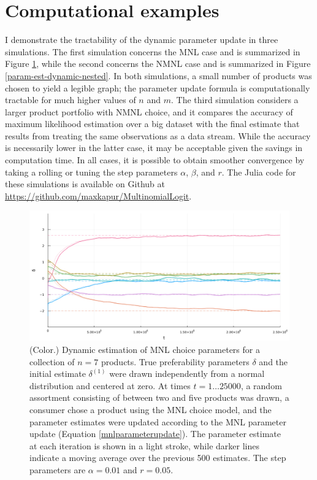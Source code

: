 \documentclass[preprint,12pt,authoryear]{elsarticle}
\begin{document}
\section{Computational examples}
I demonstrate the tractability of the dynamic parameter update in three simulations. The first simulation concerns the MNL case and is summarized in Figure \ref{param-est-dynamic-nonnested}, while the second concerns the NMNL case and is summarized in Figure \ref{param-est-dynamic-nested}. In both simulations, a small number of products was chosen to yield a legible graph; the parameter update formula is computationally tractable for much higher values of $n$ and $m$. The third simulation considers a larger product portfolio with NMNL choice, and it compares the accuracy of maximum likelihood estimation over a big dataset with the final estimate that results from treating the same observations as a data stream. While the accuracy is necessarily lower in the latter case, it may be acceptable given the savings in computation time. In all cases, it is possible to obtain smoother convergence by taking a rolling or tuning the step parameters $\alpha$, $\beta$, and $r$. The Julia code for these simulations is available on Github at \url{https://github.com/maxkapur/MultinomialLogit}. 





\begin{figure}
\begin{center}\includegraphics[width=\textwidth]{../plots/param-est-dynamic-nonnested.png}\end{center}
\captionsetup{singlelinecheck=off}
    \caption[.]{(Color.) Dynamic estimation of MNL choice parameters for a collection of $n = 7$ products. True preferability parameters $\delta$ and the initial estimate $\delta^{(1)}$ were drawn independently from a normal distribution and centered at zero. At times $t = 1 \dots 25000$, a random assortment consisting of between two and five products was drawn, a consumer chose a product using the MNL choice model, and the parameter estimates were updated according to the MNL parameter update (Equation \ref{mnlparameterupdate}). The parameter estimate at each iteration is shown in a light stroke, while darker lines indicate a moving average over the previous 500 estimates. The step parameters are $\alpha = 0.01$ and $r = 0.05$.}
\label{param-est-dynamic-nonnested}
\end{figure}
\end{document}
